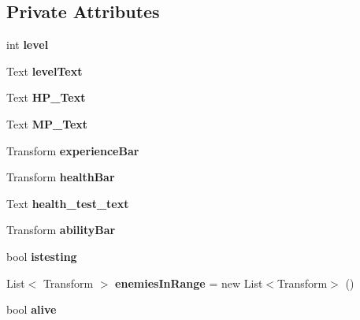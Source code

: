 \subsection*{Private Attributes}
\begin{DoxyCompactItemize}
\item 
\mbox{\label{class_player_controller_a72b14fadfbe633bb3ba317b2a59c557e}} 
int {\bfseries level}
\item 
\mbox{\label{class_player_controller_aa9db6bb729491dad366bc5237b2a4b2e}} 
Text {\bfseries level\+Text}
\item 
\mbox{\label{class_player_controller_a43b2ee93cefa5bb5cfc08543bb14e521}} 
Text {\bfseries H\+P\+\_\+\+Text}
\item 
\mbox{\label{class_player_controller_a37d401d90f09c8029b01af8d3822e013}} 
Text {\bfseries M\+P\+\_\+\+Text}
\item 
\mbox{\label{class_player_controller_a5ad2cb5bf3b10fcb03a95a6554705a2c}} 
Transform {\bfseries experience\+Bar}
\item 
\mbox{\label{class_player_controller_a9621e072923f930005839f965742d9dc}} 
Transform {\bfseries health\+Bar}
\item 
\mbox{\label{class_player_controller_adbcdb5a34b9ef5ec14081f71b58b2a8c}} 
Text {\bfseries health\+\_\+test\+\_\+text}
\item 
\mbox{\label{class_player_controller_a912728e68207fc5bf8d2ecb660d56a9b}} 
Transform {\bfseries ability\+Bar}
\item 
\mbox{\label{class_player_controller_adc7e636889690af607ff7d80d438f6fe}} 
bool {\bfseries istesting}
\item 
\mbox{\label{class_player_controller_ac14f792388196526d100787088142efc}} 
List$<$ Transform $>$ {\bfseries enemies\+In\+Range} = new List$<$Transform$>$ ()
\item 
\mbox{\label{class_player_controller_a426bc6ca141bdd47c18e08ce24f255f8}} 
bool {\bfseries alive}
\end{DoxyCompactItemize}


